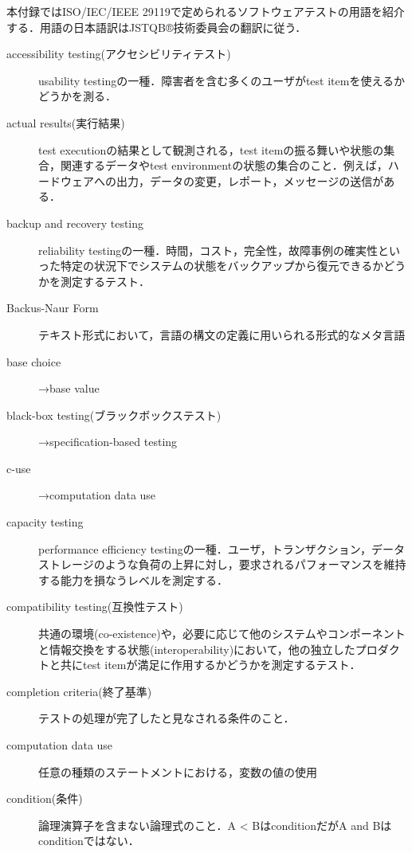 本付録ではISO/IEC/IEEE 29119\cite{ieee29119-1}\cite{ieee29119-2}\cite{ieee29119-3}\cite{ieee29119-4}\cite{ieee29119-5}で定められるソフトウェアテストの用語を紹介する．用語の日本語訳はJSTQB®技術委員会の翻訳\cite{jstqb_words}に従う．

\begin{description}
    \item[accessibility testing(アクセシビリティテスト)]usability testingの一種．障害者を含む多くのユーザがtest itemを使えるかどうかを測る．
    \item[actual results(実行結果)]test executionの結果として観測される，test itemの振る舞いや状態の集合，関連するデータやtest environmentの状態の集合のこと．例えば，ハードウェアへの出力，データの変更，レポート，メッセージの送信がある．
    \item[backup and recovery testing]reliability testingの一種．時間，コスト，完全性，故障事例の確実性といった特定の状況下でシステムの状態をバックアップから復元できるかどうかを測定するテスト．
    \item[Backus-Naur Form]テキスト形式において，言語の構文の定義に用いられる形式的なメタ言語
    \item[base choice]→base value
    \item[black-box testing(ブラックボックステスト)]→specification-based testing
    \item[c-use]→computation data use
    \item[capacity testing]performance efficiency testingの一種．ユーザ，トランザクション，データストレージのような負荷の上昇に対し，要求されるパフォーマンスを維持する能力を損なうレベルを測定する．
    \item[compatibility testing(互換性テスト)]共通の環境(co-existence)や，必要に応じて他のシステムやコンポーネントと情報交換をする状態(interoperability)において，他の独立したプロダクトと共にtest itemが満足に作用するかどうかを測定するテスト．
    \item[completion criteria(終了基準)]テストの処理が完了したと見なされる条件のこと．
    \item[computation data use]任意の種類のステートメントにおける，変数の値の使用
    \item[condition(条件)]論理演算子を含まない論理式のこと．{\sf A < B}はconditionだが{\sf A and B}はconditionではない．

\end{description}
